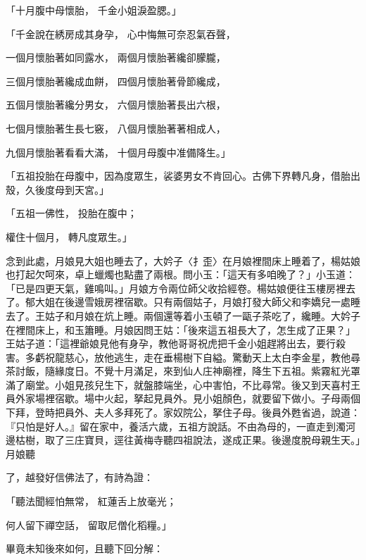 \begin{showcontents}{}
「十月腹中母懷胎，  千金小姐淚盈腮。」

「千金說在綉房成其身孕，  心中悔無可奈忍氣吞聲，

一個月懷胎著如同露水，  兩個月懷胎著纔卻朦朧，

三個月懷胎著纔成血餅，  四個月懷胎著骨節纔成，

五個月懷胎著纔分男女，  六個月懷胎著長出六根，

七個月懷胎著生長七竅，  八個月懷胎著著相成人，

九個月懷胎著看看大滿，  十個月母腹中准備降生。」

「五祖投胎在母腹中，因為度眾生，裟婆男女不肯回心。古佛下界轉凡身，借胎出殼，久後度母到天宮。」

「五祖一佛性，  投胎在腹中；

權住十個月，  轉凡度眾生。」

念到此處，月娘見大姐也睡去了，大妗子〈扌歪〉在月娘裡間床上睡着了，楊姑娘也打起欠呵來，卓上蠟燭也點盡了兩根。問小玉：「這天有多咱晚了？」小玉道：「已是四更天氣，雞鳴叫。」月娘方令兩位師父收拾經卷。楊姑娘便往玉樓房裡去了。郁大姐在後邊雪娥房裡宿歇。只有兩個姑子，月娘打發大師父和李嬌兒一處睡去了。王姑子和月娘在炕上睡。兩個還等着小玉頓了一甌子茶吃了，纔睡。大妗子在裡間床上，和玉簫睡。月娘因問王姑：「後來這五祖長大了，怎生成了正果？」王姑子道：「這裡爺娘見他有身孕，教他哥哥祝虎把千金小姐趕將出去，要行殺害。多虧祝龍慈心，放他逃生，走在垂楊樹下自縊。驚動天上太白李金星，教他尋茶討飯，隨緣度日。不覺十月滿足，來到仙人庄神廟裡，降生下五祖。紫霧紅光罩滿了廟堂。小姐見孩兒生下，就盤膝端坐，心中害怕，不比尋常。後又到天喜村王員外家場裡宿歇。場中火起，拏起見員外。見小姐顏色，就要留下做小。子母兩個下拜，登時把員外、夫人多拜死了。家奴院公，拏住子母。後員外甦省過，說道：『只怕是好人。』留在家中，養活六歲，五祖方說話。不由為母的，一直走到濁河邊枯樹，取了三庄寶貝，逕往黃梅寺聽四祖說法，遂成正果。後邊度脫母親生天。」月娘聽

了，越發好信佛法了，有詩為證：

「聽法聞經怕無常，  紅蓮舌上放毫光；

何人留下禪空話，  留取尼僧化稻糧。」

畢竟未知後來如何，且聽下回分解：





\end{showcontents}


